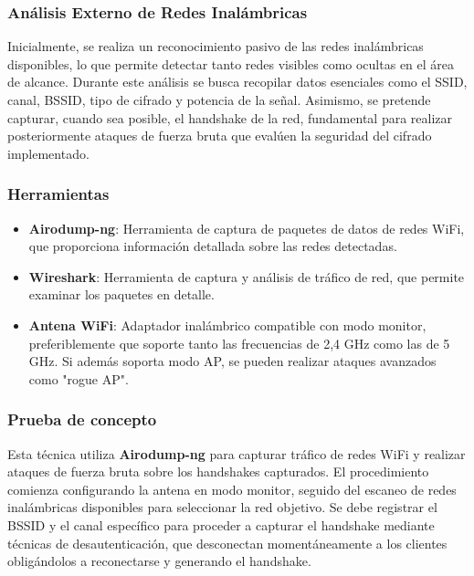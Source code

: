 \documentclass[a4paper, 11pt]{article}
\begin{document}
\subsubsection{Análisis Externo de Redes Inalámbricas}
\label{sec:analisis_redes_inalambricas}



Inicialmente, se realiza un reconocimiento pasivo de las redes inalámbricas disponibles, lo que permite detectar tanto redes visibles como ocultas en el área de alcance. Durante este análisis se busca recopilar datos esenciales como el SSID, canal, BSSID, tipo de cifrado y potencia de la señal. Asimismo, se pretende capturar, cuando sea posible, el handshake de la red, fundamental para realizar posteriormente ataques de fuerza bruta que evalúen la seguridad del cifrado implementado.


\subsubsection*{Herramientas}
\begin{itemize}
    \item \textbf{Airodump-ng}: Herramienta de captura de paquetes de datos de redes WiFi, que proporciona información detallada sobre las redes detectadas.
    \item  \textbf{Wireshark}: Herramienta de captura y análisis de tráfico de red, que permite examinar los paquetes en detalle.
    \item \textbf{Antena WiFi}: Adaptador inalámbrico compatible con modo monitor, preferiblemente que soporte tanto las frecuencias de 2,4 GHz como las de 5 GHz. Si además soporta modo AP, se pueden realizar ataques avanzados como "rogue AP".
\end{itemize}



\subsubsection*{Prueba de concepto}

Esta técnica utiliza \textbf{Airodump-ng} para capturar tráfico de redes WiFi y realizar ataques de fuerza bruta sobre los handshakes capturados. El procedimiento comienza configurando la antena en modo monitor, seguido del escaneo de redes inalámbricas disponibles para seleccionar la red objetivo. Se debe registrar el BSSID y el canal específico para proceder a capturar el handshake mediante técnicas de desautenticación, que desconectan momentáneamente a los clientes obligándolos a reconectarse y generando el handshake.
\end{document}
